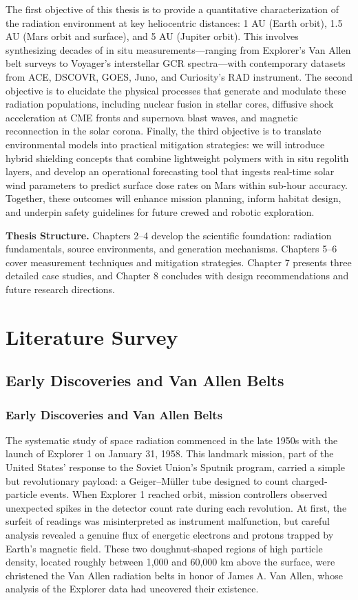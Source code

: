 \documentclass[12pt]{report}
\begin{document}
The first objective of this thesis is to provide a quantitative characterization of the radiation environment at key heliocentric distances: 1 AU (Earth orbit), 1.5 AU (Mars orbit and surface), and 5 AU (Jupiter orbit).  This involves synthesizing decades of in situ measurements—ranging from Explorer’s Van Allen belt surveys to Voyager’s interstellar GCR spectra—with contemporary datasets from ACE, DSCOVR, GOES, Juno, and Curiosity’s RAD instrument.  The second objective is to elucidate the physical processes that generate and modulate these radiation populations, including nuclear fusion in stellar cores, diffusive shock acceleration at CME fronts and supernova blast waves, and magnetic reconnection in the solar corona.  Finally, the third objective is to translate environmental models into practical mitigation strategies: we will introduce hybrid shielding concepts that combine lightweight polymers with in situ regolith layers, and develop an operational forecasting tool that ingests real-time solar wind parameters to predict surface dose rates on Mars within sub-hour accuracy.  Together, these outcomes will enhance mission planning, inform habitat design, and underpin safety guidelines for future crewed and robotic exploration.

\bigskip
\noindent\textbf{Thesis Structure.}  Chapters 2–4 develop the scientific foundation: radiation fundamentals, source environments, and generation mechanisms.  Chapters 5–6 cover measurement techniques and mitigation strategies.  Chapter 7 presents three detailed case studies, and Chapter 8 concludes with design recommendations and future research directions.

\section{Literature Survey}

\subsection{Early Discoveries and Van Allen Belts}

\subsubsection{Early Discoveries and Van Allen Belts}

The systematic study of space radiation commenced in the late 1950s with the launch of Explorer 1 on January 31, 1958.  This landmark mission, part of the United States’ response to the Soviet Union’s Sputnik program, carried a simple but revolutionary payload: a Geiger–Müller tube designed to count charged‐particle events.  When Explorer 1 reached orbit, mission controllers observed unexpected spikes in the detector count rate during each revolution.  At first, the surfeit of readings was misinterpreted as instrument malfunction, but careful analysis revealed a genuine flux of energetic electrons and protons trapped by Earth’s magnetic field.  These two doughnut‐shaped regions of high particle density, located roughly between 1,000 and 60,000 km above the surface, were christened the Van Allen radiation belts in honor of James A. Van Allen, whose analysis of the Explorer data had uncovered their existence.
\end{document}
